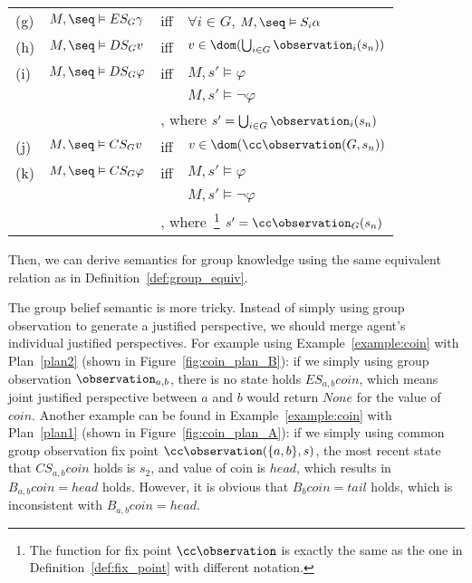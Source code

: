 \begin{tabular}{llll}
	(g) & $M,\seq \vDash ES_G\gamma$      & iff & $\forall i\in G$, $M,\seq \vDash S_i\alpha$\\[1mm]
	(h) & $M,\seq \vDash DS_G v$        & iff & $v \in \dom(\bigcup_{i\in G}\observation_i(s_n))$\\[1mm]
	(i) & $M,\seq \vDash DS_G \varphi$  & iff & $M,s' \vDash \varphi$ \\ 
	    &                               &     & $M,s' \vDash \neg \varphi$ \\
	    &                               & \multicolumn{2}{l}{ , where $s'=\bigcup_{i\in G}\observation_i(s_n)$} \\[1mm]
	(j) & $M,\seq \vDash CS_G v$        & iff & $v \in \dom(\cc\observation(G,s_n))$\\[1mm]
	
	(k) & $M,\seq \vDash CS_G \varphi$  & iff & $M,s' \vDash \varphi$ \\ 
        &                               &     & $M,s' \vDash \neg \varphi$ \\
        &                               & \multicolumn{2}{l}{ , where~\footnote{The function for fix point $\cc\observation$ is exactly the same as the one in Definition~\ref{def:fix_point} with different notation. } $s'=\cc\observation_G(s_n)$} \\[1mm]
\end{tabular}
\vspace{2mm}

Then, we can derive semantics for group knowledge using the same equivalent relation as in Definition~\ref{def:group_equiv}.

The group belief semantic is more tricky.
Instead of simply using group observation to generate a justified perspective, we should merge agent's individual justified perspectives.
For example using Example~\ref{example:coin} with Plan~\ref{plan2} (shown in Figure~\ref{fig:coin_plan_B}): 
if we simply using group observation $\observation_{a,b}$, there is no state holds $ES_{a,b} coin$, which means joint justified perspective between $a$ and $b$ would return $None$ for the value of $coin$.
Another example can be found in Example~\ref{example:coin} with Plan~\ref{plan1} (shown in Figure~\ref{fig:coin_plan_A}):
if we simply using common group observation fix point $\cc\observation(\{a,b\},s)$, the most recent state that $CS_{a,b} coin$ holds is $s_2$, and value of coin is $head$, which results in $B_{a,b} coin=head$ holds.
However, it is obvious that $B_b coin=tail$ holds, which is inconsistent with $B_{a,b} coin=head$.

